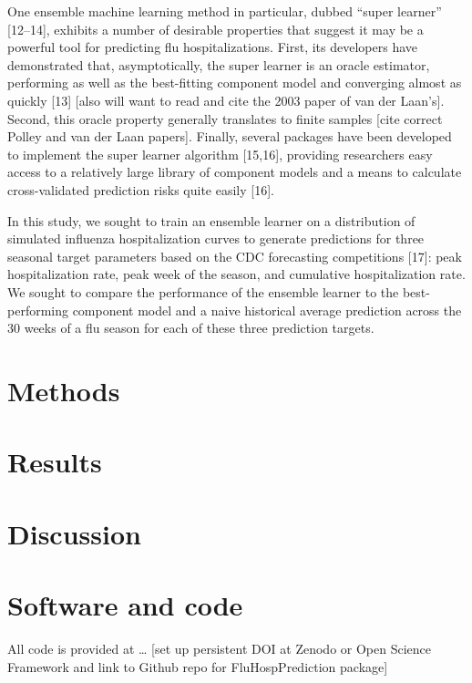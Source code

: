 \documentclass[10pt,letterpaper]{article}
\begin{document}
One ensemble machine learning method in particular, dubbed ``super
learner'' {[}12--14{]}, exhibits a number of desirable properties that
suggest it may be a powerful tool for predicting flu hospitalizations.
First, its developers have demonstrated that, asymptotically, the super
learner is an oracle estimator, performing as well as the best-fitting
component model and converging almost as quickly {[}13{]} {[}also will
want to read and cite the 2003 paper of van der Laan's{]}. Second, this
oracle property generally translates to finite samples {[}cite correct
Polley and van der Laan papers{]}. Finally, several packages have been
developed to implement the super learner algorithm {[}15,16{]},
providing researchers easy access to a relatively large library of
component models and a means to calculate cross-validated prediction
risks quite easily {[}16{]}.

In this study, we sought to train an ensemble learner on a distribution
of simulated influenza hospitalization curves to generate predictions
for three seasonal target parameters based on the CDC forecasting
competitions {[}17{]}: peak hospitalization rate, peak week of the
season, and cumulative hospitalization rate. We sought to compare the
performance of the ensemble learner to the best-performing component
model and a naive historical average prediction across the 30 weeks of a
flu season for each of these three prediction targets.

\hypertarget{methods}{%
\section{Methods}\label{methods}}

\hypertarget{results}{%
\section{Results}\label{results}}

\hypertarget{discussion}{%
\section{Discussion}\label{discussion}}

\hypertarget{software-and-code}{%
\section{Software and code}\label{software-and-code}}

All code is provided at \ldots{} {[}set up persistent DOI at Zenodo or
Open Science Framework and link to Github repo for FluHospPrediction
package{]}
\end{document}
